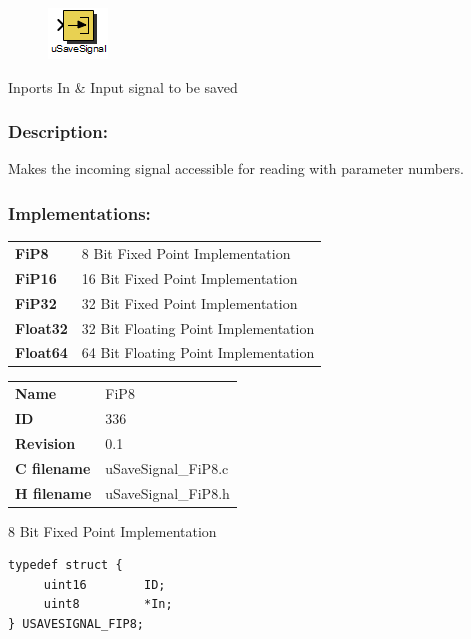 \label{block:uSaveSignal}
\begin{figure}[H]\includegraphics{uSaveSignal}\end{figure} 

\begin{XtoCtabular}{Inports}
In & Input signal to be saved\tabularnewline
\hline
\end{XtoCtabular}


\subsubsection*{Description:}
Makes the incoming signal accessible for reading with parameter numbers.


\subsubsection*{Implementations:}
\begin{tabular}{l l}
\textbf{FiP8} & 8 Bit Fixed Point Implementation\tabularnewline
\textbf{FiP16} & 16 Bit Fixed Point Implementation\tabularnewline
\textbf{FiP32} & 32 Bit Fixed Point Implementation\tabularnewline
\textbf{Float32} & 32 Bit Floating Point Implementation\tabularnewline
\textbf{Float64} & 64 Bit Floating Point Implementation\tabularnewline
\end{tabular}

\nopagebreak[0]
\begin{tabular}{l l}
\textbf{Name} & FiP8 \tabularnewline
\textbf{ID} & 336 \tabularnewline
\textbf{Revision} & 0.1 \tabularnewline
\textbf{C filename} & uSaveSignal\_FiP8.c \tabularnewline
\textbf{H filename} & uSaveSignal\_FiP8.h \tabularnewline
\end{tabular}
\vspace{1ex}

8 Bit Fixed Point Implementation

\begin{lstlisting}
typedef struct {
     uint16        ID;
     uint8         *In;
} USAVESIGNAL_FIP8;
\end{lstlisting}

